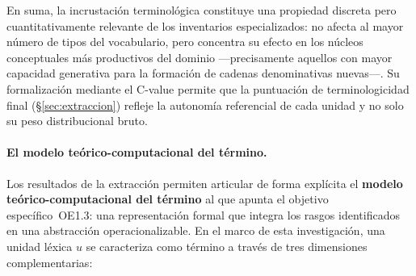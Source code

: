 En suma, la incrustación terminológica constituye una propiedad discreta pero cuantitativamente relevante de los inventarios especializados: no afecta al mayor número de tipos del vocabulario, pero concentra su efecto en los núcleos conceptuales más productivos del dominio ---precisamente aquellos con mayor capacidad generativa para la formación de cadenas denominativas nuevas---. Su formalización mediante el C-value permite que la puntuación de terminologicidad final (§\ref{sec:extraccion}) refleje la autonomía referencial de cada unidad y no solo su peso distribucional bruto.


\paragraph{El modelo teórico-computacional del término.}
Los resultados de la extracción permiten articular de forma explícita el \textbf{modelo teórico-computacional del término} al que apunta el objetivo específico~OE1.3: una representación formal que integra los rasgos identificados en una abstracción operacionalizable. En el marco de esta investigación, una unidad léxica $u$ se caracteriza como término a través de tres dimensiones complementarias:

